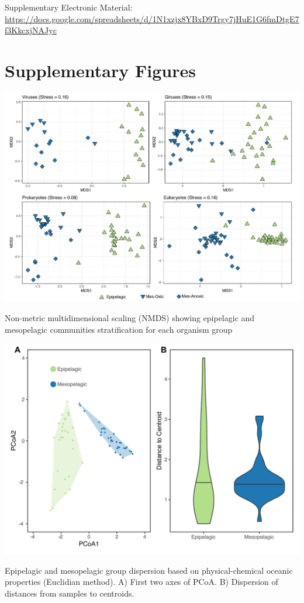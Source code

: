 \documentclass[fleqn,10pt]{wlscirep}
\begin{document}
Supplementary Electronic Material: \href{https://docs.google.com/spreadsheets/d/1N1xzjx8YBxD9Trgy7jHuE1G6fmDtgE7f3KkcxjNAJyc}{https://docs.google.com/spreadsheets/d/1N1xzjx8YBxD9Trgy7jHuE1G6fmDtgE7f3KkcxjNAJyc}

\clearpage

\section*{Supplementary Figures}

\begin{suppfigure}[ht]
    \centering
    \includegraphics[scale=0.4]{images/nmds_used_SF_to_print.pdf}
    \caption{Non-metric multidimensional scaling (NMDS) showing epipelagic and mesopelagic communities stratification for each organism group}
    \label{fig:nmds}
\end{suppfigure}
\begin{suppfigure}[ht]
    \centering
    \includegraphics[scale=0.5]{images/betadisp_diganose_to_print.pdf}
    \caption{Epipelagic and mesopelagic group dispersion based on physical-chemical oceanic properties (Euclidian method). A) First two axes of PCoA. B) Dispersion of distances from samples to centroids.}
    \label{fig:betadipersion}
\end{suppfigure}
\end{document}
